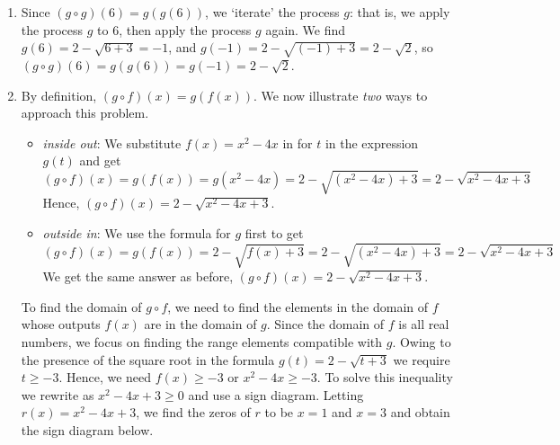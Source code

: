 \documentclass{ximera}
\begin{document}
\begin{example}
\begin{explanation}
\begin{enumerate}
\item  Since   $(g \circ g)(6) = g(g(6))$, we `iterate' the process $g$:   that is, we apply the process $g$ to $6$, then apply the process $g$ again. We find $g(6) = 2 - \sqrt{6+3} = -1$,  and $g(-1)  = 2 - \sqrt{(-1)+3} = 2 - \sqrt{2}$,   so $(g \circ g)(6) = g(g(6)) = g(-1) = 2-\sqrt{2}$.

\item  By definition, $(g \circ f)(x) = g(f(x))$. We now illustrate \textit{two} ways to approach this problem.

\begin{itemize}

\item  \textit{inside out}:  We substitute $f(x) = x^2-4x$ in for $t$ in the expression $g(t)$ and get  \[(g \circ f)(x) = g(f(x)) = g\left(x^2-4x\right) = 2 - \sqrt{\left(x^2-4x\right)+3} = 2 - \sqrt{x^2-4x+3}\] Hence, $(g \circ f)(x) = 2 - \sqrt{x^2-4x+3}$.

\item  \textit{outside in}:  We use the formula for $g$ first to get  \[(g \circ f)(x) = g(f(x)) = 2 - \sqrt{f(x)+3}  = 2 - \sqrt{\left(x^2-4x\right)+3} = 2 - \sqrt{x^2-4x+3}\] We get the same answer as before,  $(g \circ f)(x) = 2 - \sqrt{x^2-4x+3}$.

\end{itemize} 

To find the domain of $g \circ f$, we need to find the elements in the domain of $f$ whose outputs $f(x)$ are in the domain of $g$.  Since the domain of $f$ is all real numbers, we focus on finding the range elements compatible with $g$. Owing to the presence of the square root in the formula  $g(t) = 2 - \sqrt{t+3}$ we require $t \geq -3$.  Hence, we need $f(x) \geq -3$ or $x^2-4x \geq -3$.  To solve this inequality we rewrite as $x^2-4x + 3 \geq 0$ and use a sign diagram.  Letting  $r(x) = x^2-4x+3$, we find the zeros of $r$ to be $x = 1$ and $x = 3$ and obtain the sign diagram below.

\begin{image}
% 
\end{image} 


\end{enumerate}
\end{explanation}
\end{example}
\end{document}
